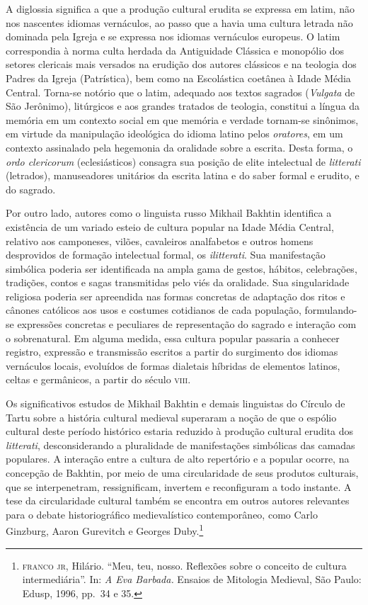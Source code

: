 A diglossia significa a que a produção cultural erudita se expressa em
latim, não nos nascentes idiomas vernáculos, ao passo que a havia uma
cultura letrada não dominada pela Igreja e se expressa nos idiomas
vernáculos europeus. O latim correspondia à norma culta herdada da
Antiguidade Clássica e monopólio dos setores clericais mais versados na
erudição dos autores clássicos e na teologia dos Padres da Igreja
(Patrística), bem como na Escolástica coetânea à Idade Média Central.
Torna-se notório que o latim, adequado aos textos sagrados
(\textit{Vulgata} de São Jerônimo), litúrgicos e aos grandes tratados
de teologia, constitui a língua da memória em um contexto social em que
memória e verdade tornam-se sinônimos, em virtude da manipulação
ideológica do idioma latino pelos \textit{oratores}, em um contexto
assinalado pela hegemonia da oralidade sobre a escrita. Desta forma, o
\textit{ordo clericorum} (eclesiásticos) consagra sua posição de elite
intelectual de \textit{litterati} (letrados), manuseadores unitários da
escrita latina e do saber formal e erudito, e do sagrado. 

Por outro lado, autores como o linguista russo Mikhail Bakhtin
identifica a existência de um variado esteio de cultura popular na
Idade Média Central, relativo aos camponeses, vilões, cavaleiros
analfabetos e outros homens desprovidos de formação intelectual formal,
os \textit{ilitterati}. Sua manifestação simbólica poderia ser
identificada na ampla gama de gestos, hábitos, celebrações, tradições,
contos e sagas transmitidas pelo viés da oralidade. Sua singularidade
religiosa poderia ser apreendida nas formas concretas de adaptação dos
ritos e cânones católicos aos usos e costumes cotidianos de cada
população, formulando-se expressões concretas e peculiares de
representação do sagrado e interação com o sobrenatural. Em alguma
medida, essa cultura popular passaria a conhecer registro, expressão e
transmissão escritos a partir do surgimento dos idiomas vernáculos
locais, evoluídos de formas dialetais híbridas de elementos latinos,
celtas e germânicos, a partir do século \textsc{viii}. 

Os significativos estudos de Mikhail Bakhtin e demais linguistas do
Círculo de Tartu sobre a história cultural medieval superaram a noção
de que o espólio cultural deste período histórico estaria reduzido à
produção cultural erudita dos \textit{litterati}, desconsiderando a
pluralidade de manifestações simbólicas das camadas populares. A
interação entre a cultura de alto repertório e a popular ocorre, na
concepção de Bakhtin, por meio de uma circularidade de seus produtos
culturais, que se interpenetram, ressignificam, invertem e reconfiguram
a todo instante. A tese da circularidade cultural também se encontra em
outros autores relevantes para o debate historiográfico medievalístico
contemporâneo, como Carlo Ginzburg, Aaron Gurevitch e Georges
Duby.\footnote{ \textsc{franco jr}, Hilário. “Meu, teu, nosso. Reflexões sobre o
conceito de cultura intermediária”. In: \textit{A Eva Barbada.} Ensaios
de Mitologia Medieval, São Paulo: Edusp, 1996, pp.~34 e 35.}

